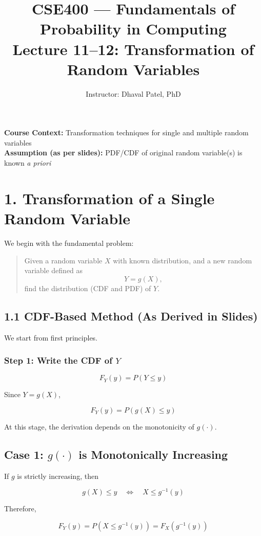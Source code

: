 \documentclass[12pt]{article}
\title{CSE400 --- Fundamentals of Probability in Computing\\
Lecture 11--12: Transformation of Random Variables}
\author{Instructor: Dhaval Patel, PhD}
\date{}
\begin{document}
\maketitle

\noindent
\textbf{Course Context:} Transformation techniques for single and multiple random variables\\
\textbf{Assumption (as per slides):} PDF/CDF of original random variable(s) is known \textit{a priori}

\section*{1. Transformation of a Single Random Variable}

We begin with the fundamental problem:

\begin{quote}
Given a random variable $X$ with known distribution, and a new random variable defined as
\[
Y = g(X),
\]
find the distribution (CDF and PDF) of $Y$.
\end{quote}

\subsection*{1.1 CDF-Based Method (As Derived in Slides)}

We start from first principles.

\subsubsection*{Step 1: Write the CDF of $Y$}

\[
F_Y(y) = P(Y \le y)
\]

Since $Y = g(X)$,

\[
F_Y(y) = P(g(X) \le y)
\]

At this stage, the derivation depends on the monotonicity of $g(\cdot)$.

\subsection*{Case 1: $g(\cdot)$ is Monotonically Increasing}

If $g$ is strictly increasing, then

\[
g(X) \le y \quad \Longleftrightarrow \quad X \le g^{-1}(y)
\]

Therefore,

\[
F_Y(y) = P(X \le g^{-1}(y)) = F_X(g^{-1}(y))
\]
\end{document}
